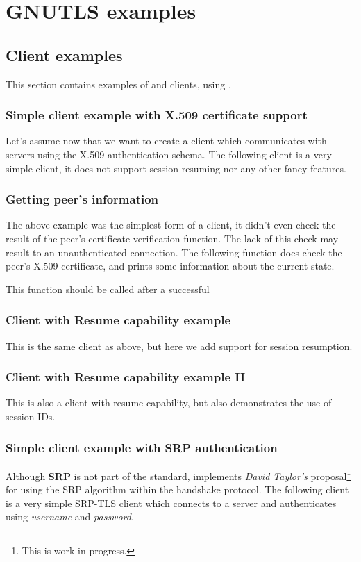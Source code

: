 \chapter{GNUTLS examples}
\section{Client examples}
This section contains examples of \tls{} and \ssl{} clients, using \gnutls{}. 

\subsection{Simple client example with X.509 certificate support}
Let's assume now that we want to create a client which communicates
with servers using the X.509 authentication schema. The following client
is a very simple \tls{} client, it does not support session resuming nor
any other fancy features.


\subsection{Getting peer's information}
\par The above example was the simplest form of a client, it didn't even check
the result of the peer's certificate verification function. The lack of
this check may result to an unauthenticated connection.
The following function does check the peer's
X.509 certificate, and prints some information about the current state.
\par
This function should be called after a successful



\subsection{Client with Resume capability example}
\label{resume-example}
This is the same client as above, but here we add support for session
resumption.


\subsection{Client with Resume capability example II}
\label{resume-example2}
This is also a client with resume capability, but also demonstrates
the use of session IDs.


\subsection{Simple client example with SRP authentication}
Although {\bf SRP} is not part of the \tls{} standard, \gnutls{} implements
{\it David Taylor's} proposal\footnote{This is work in progress.}  for using the SRP algorithm
within the \tls{} handshake protocol. The following client
is a very simple SRP-TLS client which connects to a server 
and authenticates using {\it username} and {\it password}.

